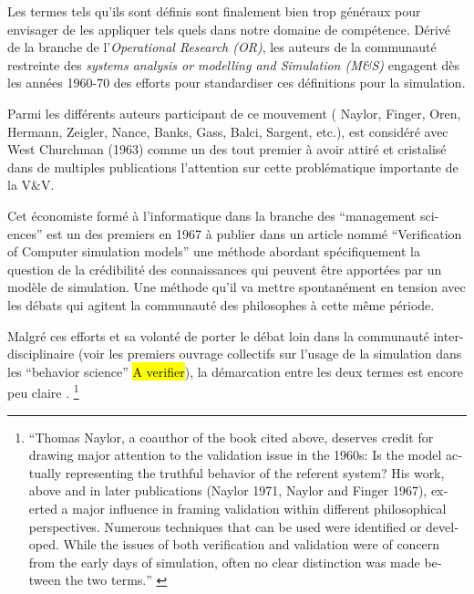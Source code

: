 Les termes tels qu'ils sont définis sont finalement bien trop généraux pour envisager de les appliquer tels quels dans notre domaine de compétence. Dérivé de la branche de l'\textit{Operational Research (OR)}, les auteurs de la communauté restreinte des \textit{systems analysis or modelling and Simulation (M\&S) } engagent dès les années 1960-70 des efforts pour standardiser ces définitions pour la simulation.


Parmi les différents auteurs participant de ce mouvement ( Naylor, Finger, Oren, Hermann, Zeigler, Nance, Banks, Gass, Balci, Sargent, etc.), \textcite{Naylor1966} est considéré avec West Churchman (1963) comme un des tout premier à avoir attiré et cristalisé  dans de multiples publications l'attention sur cette problématique importante de la V\&V.

Cet économiste formé à l'informatique dans la branche des \foreignquote{english}{management sciences} \autocite{Stricklin1985} est un des premiers en 1967 \autocite{Naylor1967} à publier dans un article nommé \foreignquote{english}{Verification of Computer simulation models} une méthode abordant spécifiquement la question de la crédibilité des connaissances qui peuvent être apportées par un modèle de simulation. Une méthode qu'il va mettre spontanément en tension avec les débats qui agitent la communauté des philosophes à cette même période.

Malgré ces efforts et sa volonté de porter le débat loin dans la communauté inter-disciplinaire (voir les premiers ouvrage collectifs sur l'usage de la simulation dans les \enquote{behavior science} \autocite{Dutton1971, Guetzkow1972} \hl{A verifier}), la démarcation entre les deux termes est encore peu claire \autocites[165]{Nance2002}[3]{Balci1986}. \footnote{\foreignquote{english}{Thomas Naylor, a coauthor of the book cited above, deserves credit for drawing major attention to the validation issue in the 1960s: Is the model actually representing the truthful behavior of the referent system? His work, above and in later publications (Naylor 1971, Naylor and Finger 1967), exerted a major influence in framing validation within different philosophical perspectives. Numerous techniques that can be used were identified or developed. While the issues of both verification and validation were of concern from the early days of simulation, often no clear distinction was made between the two terms.} \autocite[165]{Nance2002}}


